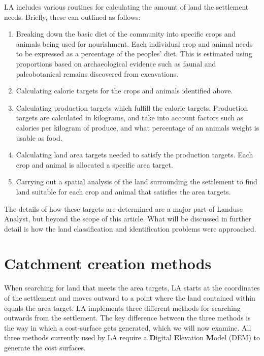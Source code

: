 LA includes various routines for calculating the amount of land 
the settlement needs.  Briefly, these can outlined as follows:

  \begin{enumerate} 
  \item Breaking down the basic diet of the community into specific crops and
  animals being used for nourishment.  Each individual crop and animal needs to
  be expressed as a percentage of the peoples' diet.  This is estimated using
  proportions based on archaeological evidence such as faunal and
  paleobotanical remains discovered from excavations.  
  \item Calculating  calorie targets for the crops and animals identified above.  
  \item Calculating production targets which fulfill the calorie targets.
  Production targets are calculated in kilograms, and take into account factors such as 
  calories per kilogram of produce, and what percentage of an animals weight is
  usable as food.  
  \item Calculating land area targets needed to satisfy the
  production targets.  Each crop and animal is allocated a specific area
  target.  
  \item Carrying out a spatial analysis of the land surrounding the settlement to
  find land suitable for each crop and animal that satisfies the area targets.  
  \end{enumerate}

The details of how these targets are determined are a major part of Landuse
Analyst, but beyond the scope of this article.  What will be discussed in
further detail is how the land classification and identification problems were
approached.

\section{Catchment creation methods} 

When searching for land that meets the area targets, LA starts at
the coordinates of the settlement and moves outward to a point where the land
contained within equals the area target.  LA implements three
different methods for searching outwards from the settlement.  The key
difference between the three methods is the way in which a cost-surface gets
generated, which we will now examine.  All three methods currently used by LA
require a \textbf{D}igital \textbf{E}levation \textbf{M}odel (DEM) to generate
the cost surfaces.



